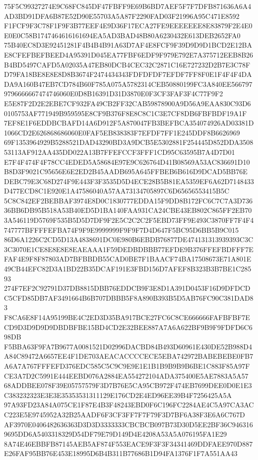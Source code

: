 \documentclass[UTF8,fontset=fandol,zihao=-4,a4paper]{ctexart}
\begin{document}
{{75F5C99327274E9C68FC845DF47FBFF9E69B6BD7AEF5F7F7DFB871636A6A4AD3BD91DFA6B87E52D90E55703A5A87F2290FAD03F21996A95C471E8592
F1FCF9F3C78F1F9F3B77EEF4E9D36F17ECA27FE9EEEEEEE8E83879F2E4E0E0E0C58B1747464616161694EA5AD3BAD48B80A6230432E613DEB2652FA0
75B40EC8D3E92451281F4B4B4B91A63D7AF4E8FCF9F39D9D9D1BCD2E12BAE8CFEFBEFBEED4A95391D045EA77FBF6EDF9F979E792E7A375712EEB8B26
B4BD5497CAFD5A02035A47EB80DCB4CEC32C2871C16E727232D2B7E3C78FD79FA18BE8E8E8D8B3674F2474434343FDFDFDF7EFDF7FF8F0E1F4F4F4DA
DA9A160B47EB7CD784B60F785A075A5782314CEB50880199FC3A840EE5667979796666667474746060E0D8B16391D31D3870E0F3CF3FAF3F4C77F9F2
E5E87F2D2E2EBE7CF932FA49CB2FF32CAB59878900A9D56A9EAA830C93D60105753AF771949B959595E8CF9B376F8E8C8C1C3E7CF8DB6FBFBDF19A1F
7EF8E1F6EDDBCBAFD14A6D912F5A870047FB3BEFBCA354074926AD03381D1066CD2E626868686060E0FAF5EB838383F7EFDF7FF1E245DDF8B6626969
69F1353964929B5288521DAD43290BD3A9DCB5E5302881F254445D852DDA350853113AF912AA435DD022A13B7FFEFCCF3FFF1CD95C63595B7A4D7D01
E7F4F474F4F78CC4EDED5A58684E97E9C626764D41B08569A53AC836691D10B8D3F9021C95656E6E2ED2B45AADB695A645FFBEB6B616D9DCAD5BB76E
DEBC79E3C68D274F9E443F3F3535D5D4ECE28B5B81EA5359EF6A62D7148433D477ECD8C1E920E1A47586040A57AA73134705897C6D65656553415B5C
5C8C842EF2BEBBAF3974E8D0C1830777EDDA15F9DD8B172FC6C7C7A3D73636BB6DB95B518A53B40ED5D1BA140FAA931CA24CBE43EB802C865FF2EB70
3A546119D5769F535B5D5D7DF9F2E5C2C2C2F5EBD73FF9E493C3870FF7F4F4747777BFFFFEFBA74F9F9E9999999F9F9F7D4D647F5BC95D6BB5B9C015
86D6A1226C2CD5D13A4838691DC0E980B6EBDB76877DE474131313939393C3C3C3070E1CE8E8E8E8EAEAAA1F59DEDBDBBB77EFDE9B376FFEFBDFFF7E
FAF4E9F8F87803AD7BFBBDB55CAD0BE7F1BAACF74BA17508673E71A801E49CB44EFC82D3A1BD22B35DCAF191E3FBD156D7AFEF8B323B3B7BE1C28593
274F7EF2C92791D37DB8815DBB76EDDCB9F3E8D1A391D0453F16D9DFDCDC5CFD85DB7AF3491664B6B707DBBB5F8A890B393B5D5AB76FC90C381DAD83
F8CA6E8F14A95199BE4C2ED3D35BA917BCE27FC6C8CE666666FAFBFBF7ECD9D3D9D9D9DBDBFBE15BD4CD2E32BEE887A7A6A622BF9B9F9FDFD6C698DB
F5BBA63F9FA7B9677A0081521D02996DACBD84B493D60961E430DE52B988D4A84C89472A6657EE4F1DE703AEACACCCCECE5EBA742972BABEBEBE0FB7
A6A7A767FFFEFD376EDC585C5C9C9E9E1E1B1B9B9B9B6BE1C883F85A97FCE3A7D2C5991E444EEBD076A2884EA554272104ADA375400E5AE7883A5A57
68ADDBEE078F39E05757579F3D7B76E5CA95CB972F474EB7699DEE0D0E1E3C383232323E3E3E35353531311129E176CD2E4ED96EE39B4F7256425A5A
97A93FD23A84A075CE1F87E4B3F48243EBD0F6C196FC2284AE4C5A97CA3ACC223E5E9745952A32B25AADF6F3CF3FF7F7F79F3D7BF6A38F3E6A6C767D
AF3970E0406482636363D3D3D3333333CBCBCB097B73D30D5EE2BF36C9463169695DD6A5403318329D54DF79E79D149D4E4208A53A5A076195FA1E29
8A74E46EBBFB87145AEB5AF874F553EACE9F3F3F34341469DDFAEE970D887E26FAF95BB76E453E18995D6B4B311B77686B1D94FA1376F1F7A551AA43
}}
\end{document}

